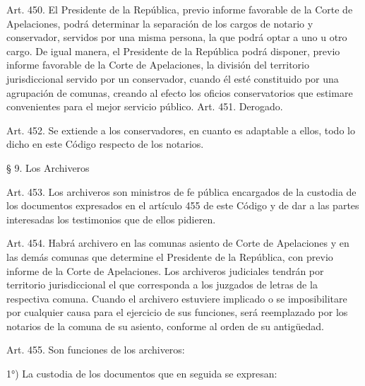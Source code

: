     Art. 450. El Presidente de la República, previo informe favorable de la Corte de Apelaciones, podrá determinar la separación de los cargos de notario y conservador, servidos por una misma persona, la que podrá optar a uno u otro cargo.
    De igual manera, el Presidente de la República podrá disponer, previo informe favorable de la Corte de Apelaciones, la división del territorio jurisdiccional servido por un conservador, cuando él esté constituido por una agrupación de comunas, creando al efecto los oficios conservatorios que estimare convenientes para el mejor servicio público.
    Art. 451. Derogado.



    Art. 452. Se extiende a los conservadores, en cuanto es adaptable a ellos, todo lo dicho en este Código respecto de los notarios.




    § 9. Los Archiveros


    Art. 453. Los archiveros son ministros de fe pública encargados de la custodia de los documentos expresados en el artículo 455 de este Código y de dar a las partes interesadas los testimonios que de ellos pidieren.


    Art. 454. Habrá archivero en las comunas asiento de Corte de Apelaciones y en las demás comunas que determine el Presidente de la República, con previo informe de la Corte de Apelaciones.
    Los archiveros judiciales tendrán por territorio jurisdiccional el que corresponda a los juzgados de letras de la respectiva comuna.
    Cuando el archivero estuviere implicado o se imposibilitare por cualquier causa para el ejercicio de sus funciones, será reemplazado por los notarios de la comuna de su asiento, conforme al orden de su antigüedad.



    Art. 455. Son funciones de los archiveros:

    1°) La custodia de los documentos que en seguida se expresan:

